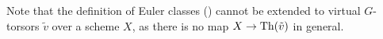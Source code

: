 %
\begin{rem}\label{ex:virtual_Euler_classes}
Note that the definition of Euler classes ()
cannot be extended to virtual $G$-torsors $\tilde v$ over a scheme $X$,
as there is no map $X \rightarrow \operatorname{Th}(\tilde v)$ in general.
\end{rem}

